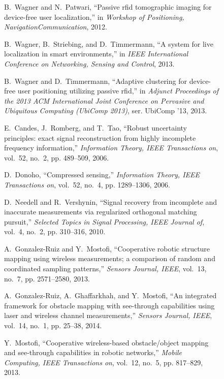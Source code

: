 \documentclass[journal]{IEEEtran}
\begin{document}
\begin{figure*}
\begin{thebibliography}{100}
B.~Wagner and N.~Patwari, ``Passive rfid tomographic imaging for device-free
  user localization,'' in \emph{Workshop of Positioning,
  NavigationCommunication}, 2012.

B.~Wagner, B.~Striebing, and D.~Timmermann, ``A system for live localization in
  smart environments,'' in \emph{IEEE International Conference on Networking,
  Sensing and Control}, 2013.

B.~Wagner and D.~Timmermann, ``Adaptive clustering for device-free user
  positioning utilizing passive rfid,'' in \emph{Adjunct Proceedings of the
  2013 ACM International Joint Conference on Pervasive and Ubiquitous Computing
  (UbiComp 2013)}, ser. UbiComp '13, 2013.

E.~Candes, J.~Romberg, and T.~Tao, ``Robust uncertainty principles: exact
  signal reconstruction from highly incomplete frequency information,''
  \emph{Information Theory, IEEE Transactions on}, vol.~52, no.~2, pp.
  489--509, 2006.

D.~Donoho, ``Compressed sensing,'' \emph{Information Theory, IEEE Transactions
  on}, vol.~52, no.~4, pp. 1289--1306, 2006.

D.~Needell and R.~Vershynin, ``Signal recovery from incomplete and inaccurate
  measurements via regularized orthogonal matching pursuit,'' \emph{Selected
  Topics in Signal Processing, IEEE Journal of}, vol.~4, no.~2, pp. 310--316,
  2010.

A.~Gonzalez-Ruiz and Y.~Mostofi, ``Cooperative robotic structure mapping using
  wireless measurements; a comparison of random and coordinated sampling
  patterns,'' \emph{Sensors Journal, IEEE}, vol.~13, no.~7, pp. 2571--2580,
  2013.

A.~Gonzalez-Ruiz, A.~Ghaffarkhah, and Y.~Mostofi, ``An integrated framework for
  obstacle mapping with see-through capabilities using laser and wireless
  channel measurements,'' \emph{Sensors Journal, IEEE}, vol.~14, no.~1, pp.
  25--38, 2014.

Y.~Mostofi, ``Cooperative wireless-based obstacle/object mapping and
  see-through capabilities in robotic networks,'' \emph{Mobile Computing, IEEE
  Transactions on}, vol.~12, no.~5, pp. 817--829, 2013.


\end{thebibliography}
\end{figure*}
\end{document}
